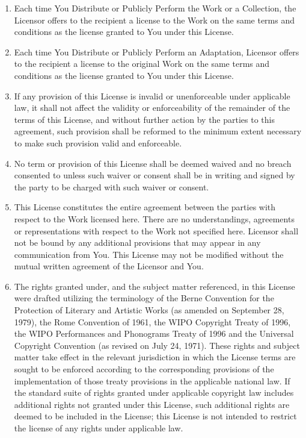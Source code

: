 \begin{enumerate}
\item
  Each time You Distribute or Publicly Perform the Work or a
  Collection, the Licensor offers to the recipient a license to the
  Work on the same terms and conditions as the license granted to You
  under this License.
\item
  Each time You Distribute or Publicly Perform an Adaptation,
  Licensor offers to the recipient a license to the original Work on
  the same terms and conditions as the license granted to You under
  this License.
\item
  If any provision of this License is invalid or unenforceable under
  applicable law, it shall not affect the validity or enforceability
  of the remainder of the terms of this License, and without further
  action by the parties to this agreement, such provision shall be
  reformed to the minimum extent necessary to make such provision
  valid and enforceable.
\item
  No term or provision of this License shall be deemed waived and no
  breach consented to unless such waiver or consent shall be in
  writing and signed by the party to be charged with such waiver or
  consent.
\item
  This License constitutes the entire agreement between the parties
  with respect to the Work licensed here. There are no
  understandings, agreements or representations with respect to the
  Work not specified here. Licensor shall not be bound by any
  additional provisions that may appear in any communication from
  You. This License may not be modified without the mutual written
  agreement of the Licensor and You.
\item
  The rights granted under, and the subject matter referenced, in
  this License were drafted utilizing the terminology of the Berne
  Convention for the Protection of Literary and Artistic Works (as
  amended on September 28, 1979), the Rome Convention of 1961, the
  WIPO Copyright Treaty of 1996, the WIPO Performances and Phonograms
  Treaty of 1996 and the Universal Copyright Convention (as revised
  on July 24, 1971). These rights and subject matter take effect in
  the relevant jurisdiction in which the License terms are sought to
  be enforced according to the corresponding provisions of the
  implementation of those treaty provisions in the applicable
  national law. If the standard suite of rights granted under
  applicable copyright law includes additional rights not granted
  under this License, such additional rights are deemed to be
  included in the License; this License is not intended to restrict
  the license of any rights under applicable law.
\end{enumerate}
